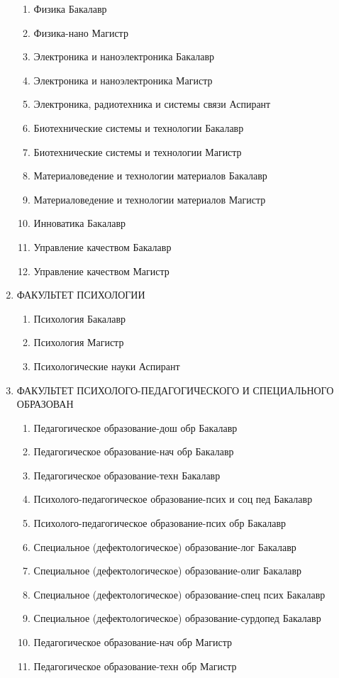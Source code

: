 \begin{enumerate}
\begin{enumerate}
\item Физика	Бакалавр
\item Физика-нано	Магистр
\item Электроника и наноэлектроника	Бакалавр
\item Электроника и наноэлектроника	Магистр
\item Электроника, радиотехника и системы связи	Аспирант
\item Биотехнические системы и технологии	Бакалавр
\item Биотехнические системы и технологии	Магистр
\item Материаловедение и технологии материалов	Бакалавр
\item Материаловедение и технологии материалов	Магистр
\item Инноватика	Бакалавр
\item Управление качеством	Бакалавр
\item Управление качеством	Магистр
\end{enumerate}
\item ФАКУЛЬТЕТ ПСИХОЛОГИИ
\begin{enumerate}
\item Психология	Бакалавр
\item Психология	Магистр
\item Психологические науки	Аспирант
\end{enumerate}
\item ФАКУЛЬТЕТ ПСИХОЛОГО-ПЕДАГОГИЧЕСКОГО И СПЕЦИАЛЬНОГО ОБРАЗОВАН
\begin{enumerate}
\item Педагогическое образование-дош обр	Бакалавр
\item Педагогическое образование-нач обр	Бакалавр
\item Педагогическое образование-техн	Бакалавр
\item Психолого-педагогическое образование-псих и соц пед	Бакалавр
\item Психолого-педагогическое образование-псих обр	Бакалавр
\item Специальное (дефектологическое) образование-лог	Бакалавр
\item Специальное (дефектологическое) образование-олиг	Бакалавр
\item Специальное (дефектологическое) образование-спец псих	Бакалавр
\item Специальное (дефектологическое) образование-сурдопед	Бакалавр
\item Педагогическое образование-нач обр	Магистр
\item Педагогическое образование-техн обр	Магистр

\end{enumerate}
\end{enumerate}

